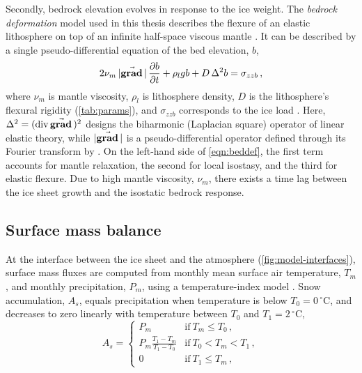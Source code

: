 \documentclass[a4paper]{kappa}
\newcommand{\vect}[1]{\va*{#1}} %
\renewcommand{\div}[1]{\mathrm{div}\,#1}            %
\renewcommand{\grad}[1]{\vect{\mathrm{grad}}\,#1}   %
\newcommand{\unit}[1]{\ensuremath{\mathrm{#1}}}
\newcommand{\degree}[0]{\ensuremath{^{\circ}}}
\newcommand{\degC}[0]{\unit{{\degree}C}}
\begin{document}
Secondly, bedrock elevation evolves in response to the ice weight. The
\emph{bedrock deformation} model used in this thesis describes the flexure of
an elastic
lithosphere on top of an infinite half-space viscous mantle
\citep{Lingle.Clark.1985}. It can be described by a single pseudo-differential
equation of the bed elevation, $b$,
\begin{equation}
    \label{eqn:beddef}
    2\nu_m\,|\grad|\,\pdv{b}{t} + \rho_l g b + D\,\Delta^2 b = \sigma_{zzb} \,,
\end{equation}
where $\nu_m$ is mantle viscosity, $\rho_l$ is lithosphere density, $D$ is the
lithosphere's flexural rigidity (\cref{tab:params}), and $\sigma_{zzb}$
corresponds to the ice load
\citep{Bueler.etal.2007}. Here, ${\Delta^2 = (\div\grad{})^2}$ designs the
biharmonic (Laplacian square) operator of
linear elastic theory, while $|\grad{}|$ is a pseudo-differential operator
defined through its Fourier transform by \citet[Eq.~6]{Bueler.etal.2007}. On
the left-hand side of \cref{eqn:beddef}, the first term accounts for mantle
relaxation, the second for local isostasy, and the third for elastic
flexure. Due to high mantle viscosity, $\nu_m$, there exists a time lag between
the ice sheet growth and the isostatic bedrock response.


\subsection{Surface mass balance}

At the interface between the ice sheet and the atmosphere
(\cref{fig:model-interfaces}),
surface mass fluxes are computed from monthly mean surface air temperature,
$T_m$, and monthly precipitation, $P_m$, using a temperature-index model
\citep[\cref{fig:model-pdd}; cf.][]{Hock.2003}. Snow accumulation, $A_s$,
equals precipitation
when temperature is below ${T_0=0\,\degC}$, and decreases to zero
linearly with temperature between $T_0$ and ${T_1=2\,\degC}$,
\begin{equation}
    A_s =
    \begin{cases}
        P_m     & \text{if}\ T_m \le T_0 \,, \\
        P_m \frac{T_1-T_m}{T_1-T_0}
                & \text{if}\ T_0 < T_m < T_1 \,, \\
        0       & \text{if}\ T_1 \le T_m \,,
    \end{cases}
\end{equation}
\end{document}
